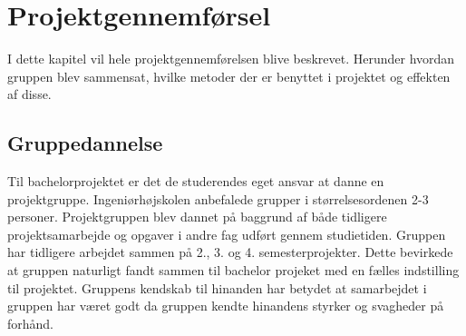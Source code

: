 \chapter{Projektgennemførsel}
I dette kapitel vil hele projektgennemførelsen blive beskrevet. Herunder hvordan
gruppen blev sammensat, hvilke metoder der er benyttet i projektet og effekten af disse.

\section{Gruppedannelse}
Til bachelorprojektet er det de studerendes eget ansvar at danne en projektgruppe. 
Ingeniørhøjskolen anbefalede grupper i størrelsesordenen 2-3 personer. Projektgruppen
blev dannet på baggrund af både tidligere projektsamarbejde og opgaver i andre fag udført gennem studietiden. 
Gruppen har tidligere arbejdet sammen på 2., 3. og 4. semesterprojekter.
Dette bevirkede at gruppen naturligt fandt sammen til bachelor projeket med en fælles indstilling til projektet.
Gruppens kendskab til hinanden har betydet at samarbejdet i gruppen har været godt da gruppen kendte hinandens styrker og svagheder på forhånd. \\